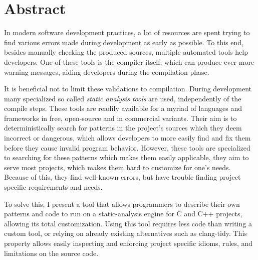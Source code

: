 \chapter*{Abstract}

In modern software development practices, a lot of resources are spent trying to find various errors made during development as early as possible.
To this end, besides manually checking the produced sources, multiple automated tools help developers.
One of these tools is the compiler itself, which can produce ever more warning messages, aiding developers during the compilation phase.

It is beneficial not to limit these validations to compilation.
During development many specialized so called {\it static analysis tools} are used, independently of the compile steps.
These tools are readily available for a myriad of languages and frameworks in free, open-source and in commercial variants.
Their aim is to deterministically search for patterns in the project's sources which they deem incorrect or dangerous, which allows developers to more easily find and fix them before they cause invalid program behavior.
However, these tools are specialized to searching for these patterns which makes them easily applicable, they aim to serve most projects, which makes them hard to customize for one's needs.
Because of this, they find well-known errors, but have trouble finding project specific requirements and needs.

To solve this, I present a tool that allows programmers to describe their own patterns and code to run on a static-analysis engine for C and C++ projects, allowing its total customization.
Using this tool requires less code than writing a custom tool, or relying on already existing alternatives such as clang-tidy.
This property allows easily inspecting and enforcing project specific idioms, rules, and limitations on the source code.

\vfill
\selectthesislanguage

\setcounter{romanPage}{\value{page}}
